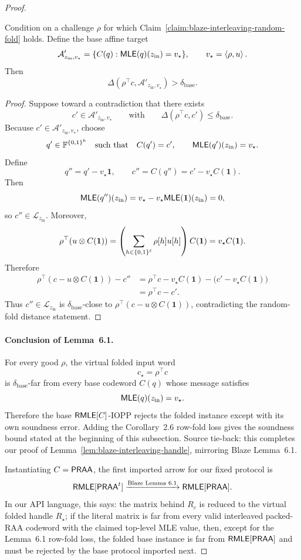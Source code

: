 \begin{proof}
\begin{claim}
\label{claim:blaze-interleaving-second-shift}
Condition on a challenge \(\rho\) for which
Claim~\ref{claim:blaze-interleaving-random-fold} holds.  Define the base affine
target
\[
  \mathcal A'_{z_{\mathrm{in}},v_\star}
  =
  \{C(q):\mathsf{MLE}(q)(z_{\mathrm{in}})=v_\star\},
  \qquad
  v_\star=\left\langle \rho,u \right\rangle.
\]
Then
\[
  \Delta(\rho^\top c,\mathcal A'_{z_{\mathrm{in}},v_\star})
  >
  \delta_{\mathrm{base}}.
\]
\end{claim}

\begin{proof}
Suppose toward a contradiction that there exists
\[
  c'\in\mathcal A'_{z_{\mathrm{in}},v_\star}
  \qquad\text{with}\qquad
  \Delta(\rho^\top c,c')\le\delta_{\mathrm{base}}.
\]
Because \(c'\in\mathcal A'_{z_{\mathrm{in}},v_\star}\), choose
\[
  q'\in\mathbb{F}^{\{0,1\}^k}
  \quad\text{such that}\quad
  C(q')=c',
  \qquad
  \mathsf{MLE}(q')(z_{\mathrm{in}})=v_\star.
\]
Define
\[
  q''=q'-v_\star\mathbf 1,
  \qquad
  c''=C(q'')=c'-v_\star C(\mathbf 1).
\]
Then
\[
  \mathsf{MLE}(q'')(z_{\mathrm{in}})
  =
  v_\star-v_\star\mathsf{MLE}(\mathbf 1)(z_{\mathrm{in}})
  =
  0,
\]
so \(c''\in\mathcal L_{z_{\mathrm{in}}}\).  Moreover,
\[
  \rho^\top(u\otimes C(\mathbf 1))
  =
  \left(\sum_{h\in\{0,1\}^\ell}\rho[h]u[h]\right)C(\mathbf 1)
  =
  v_\star C(\mathbf 1).
\]
Therefore
\[
\begin{aligned}
  \rho^\top(c-u\otimes C(\mathbf 1))-c''
  &=
  \rho^\top c-v_\star C(\mathbf 1)
  -\bigl(c'-v_\star C(\mathbf 1)\bigr) \\
  &=
  \rho^\top c-c'.
\end{aligned}
\]
Thus \(c''\in\mathcal L_{z_{\mathrm{in}}}\) is
\(\delta_{\mathrm{base}}\)-close to
\(\rho^\top(c-u\otimes C(\mathbf 1))\), contradicting the random-fold distance
statement.
\end{proof}

\paragraph{Conclusion of Lemma~6.1.}
For every good \(\rho\), the virtual folded input word
\[
  c_\star=\rho^\top c
\]
is \(\delta_{\mathrm{base}}\)-far from every base codeword \(C(q)\) whose
message satisfies
\[
  \mathsf{MLE}(q)(z_{\mathrm{in}})=v_\star.
\]
Therefore the base \(\mathsf{RMLE}[C]\)-IOPP rejects the folded instance except with
its own soundness error.  Adding the Corollary~2.6 row-fold loss gives the
soundness bound stated at the beginning of this subsection.  Source tie-back:
this completes our proof of Lemma~\ref{lem:blaze-interleaving-handle}, mirroring
Blaze Lemma~6.1.

Instantiating \(C=\mathsf{PRAA}\), the first imported arrow for our fixed protocol is
\[
  \mathsf{RMLE}[\mathsf{PRAA}^t]
  \xrightarrow{\text{Blaze Lemma~6.1}}
  \mathsf{RMLE}[\mathsf{PRAA}].
\]
In our API language, this says: the matrix behind \(R_c\) is reduced to the
virtual folded handle \(R_\star\); if the literal matrix is far from every
valid interleaved packed-RAA codeword with the claimed top-level MLE value,
then, except for the Lemma~6.1 row-fold loss, the folded base instance is far
from \(\mathsf{RMLE}[\mathsf{PRAA}]\) and must be rejected by the base protocol imported next.
\end{proof}

